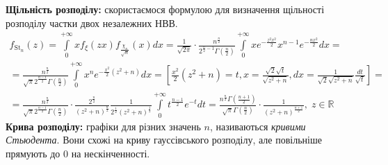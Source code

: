 \noindent\textbf{Щільність розподілу:} скористаємося формулою для визначення щільності розподілу частки
двох незалежних НВВ.
\begin{gather*}
    f_{\mathrm{St}_n} (z) = \int\limits_0^{+\infty} x f_{\xi}(z x) f_{\frac{\chi_n}{\sqrt{n}}} (x) dx =
    \frac{1}{\sqrt{2\pi}} \cdot \frac{n^{\frac{n}{2}}}{2^{\frac{n}{2} - 1} \Gamma\left(\frac{n}{2}\right)}
    \int\limits_0^{+\infty} x e^{-\frac{z^2 x^2}{2}} x^{n-1} e^{-\frac{nx^2}{2}} dx = \\
    = \frac{n^{\frac{n}{2}}}{\sqrt{\pi} 2^{\frac{n-1}{2}} \Gamma\left(\frac{n}{2}\right)}
    \int\limits_0^{+\infty} x^n e^{-\frac{x^2}{2}(z^2+n)} dx = 
    \left[ \frac{x^2}{2} (z^2 + n) = t, x = \frac{\sqrt{2} \sqrt{t}}{\sqrt{z^2 + n}},
    dx = \frac{1}{\sqrt{2}\sqrt{z^2 + n}} \frac{dt}{\sqrt{t}}\right] = \\
    = \frac{n^{\frac{n}{2}}}{\sqrt{\pi} 2^{\frac{n-1}{2}} \Gamma\left(\frac{n}{2}\right)} \cdot
    \frac{2^{\frac{n}{2}}}{(z^2 + n)^{\frac{n}{2}}} \frac{1}{2^{\frac{1}{2}}(z^2 + n)^{\frac{1}{2}}}
    \int\limits_0^{+\infty} t^{\frac{n-1}{2}} e^{-t} dt = 
    \frac{n^{\frac{n}{2}} \Gamma\left(\frac{n+1}{2}\right)}{\sqrt{\pi} \Gamma\left(\frac{n}{2}\right)} \cdot
    \frac{1}{(z^2 + n)^{\frac{n+1}{2}}}, \; z \in \mathbb{R}
\end{gather*}
\noindent \textbf{Крива розподілу:} графіки для різних значень $n$, називаються \emph{кривими Стьюдента}.
Вони схожі на криву гауссівського розподілу, але повільніше прямують до 0 на нескінченності.
\begin{center}
\end{center}

